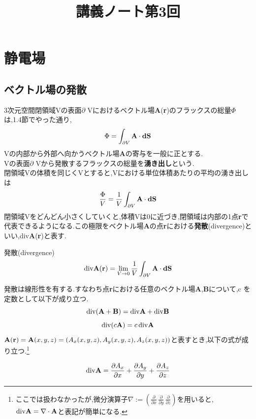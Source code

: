 \documentclass{jsarticle}
\title{講義ノート第3回}
\author{}
\date{}
\begin{document}
\maketitle

\section{静電場}

\setcounter{subsection}{6}

\subsection{ベクトル場の発散}
3次元空間閉領域Vの表面$\partial$ Vにおけるベクトル場{\bf A}({\bf r})のフラックスの総量$\Phi$ は,1.4節でやった通り,
\begin{equation}
\Phi = \int_{\partial V}^{}{\bf A}\cdot{\bf dS}
\end{equation}
Vの内部から外部へ向かうベクトル場{\bf A}の寄与を一般に正とする.\\
Vの表面$\partial$ Vから発散するフラックスの総量を{\bf 湧き出し}という.\\
閉領域Vの体積を同じくVとすると,Vにおける単位体積あたりの平均の湧き出しは
\begin{equation}
\frac{\Phi}{V}=\frac{1}{V}\int_{\partial V}^{}{\bf A}\cdot {\bf dS}
\end{equation}
閉領域Vをどんどん小さくしていくと,体積Vは0に近づき,閉領域は内部の1点{\bf r}で代表できるようになる.この極限をベクトル場{\bf A}の点{\bf r}における{\bf 発散}(divergence)といい,div{\bf A}({\bf r})と表す.
\begin{itembox}[c]{発散(divergence)}
\begin{equation}
{\rm div}{\bf A}({\bf r})= \lim_{V \to 0}\frac{1}{V}\int_{\partial V}^{}{\bf A}\cdot {\bf dS}
\end{equation}
\end{itembox}

発散は線形性を有する.すなわち点{\bf r}における任意のベクトル場{\bf A},{\bf B}について,c	を定数として以下が成り立つ.
\begin{equation}
{\rm div}({\bf A}+{\bf B})={\rm div}{\bf A}+{\rm div}{\bf B}
\end{equation}
\begin{equation}
{\rm div}(c{\bf A})=c\,{\rm div}{\bf A}
\end{equation}
${\bf A}({\bf r})={\bf A}(x,y,z)=(A_x(x,y,z),A_y(x,y,z),A_z(x,y,z))$と表すとき,以下の式が成り立つ.\footnote{ここでは扱わなかったが,微分演算子$\nabla:=\left( \frac{\partial}{\partial x} \, \frac{\partial}{\partial y} \, \frac{\partial}{\partial z} \right) $を用いると, ${\rm div}{\bf A}=\nabla \cdot {\bf A}$と表記が簡単になる.}
\begin{itembox}[c]{}
\begin{equation}
{\rm div}{\bf A}=\frac{\partial A_x}{\partial x}+\frac{\partial A_y}{\partial y}+\frac{\partial A_z}{\partial z}
\end{equation}
\end{itembox}
\end{document}

